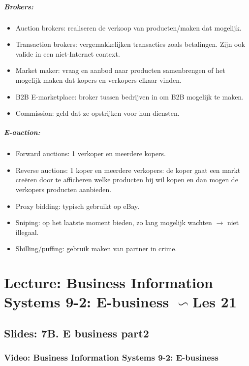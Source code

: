 \documentclass[10pt,a4paper]{report}
\begin{document}
\paragraph{Brokers:}
\begin{itemize}
\item Auction brokers: realiseren de verkoop van producten/maken dat mogelijk.
\item Transaction brokers: vergemakkelijken transacties zoals betalingen. Zijn ook valide in een niet-Internet context.
\item Market maker: vraag en aanbod naar producten samenbrengen of het mogelijk maken dat kopers en verkopers elkaar vinden.
\item B2B E-marketplace: broker tussen bedrijven in om B2B mogelijk te maken.
\item Commission: geld dat ze opstrijken voor hun diensten.
\end{itemize}

\paragraph{E-auction:}
\begin{itemize}
\item Forward auctions: 1 verkoper en meerdere kopers.
\item Reverse auctions: 1 koper en meerdere verkopers: de koper gaat een markt creëren door te afficheren welke producten hij wil kopen en dan mogen de verkopers producten aanbieden.
\item Proxy bidding: typisch gebruikt op eBay.
\item Sniping: op het laatste moment bieden, zo lang mogelijk wachten $\rightarrow$ niet illegaal.
\item Shilling/puffing: gebruik maken van partner in crime.
\end{itemize}

\chapter{Lecture: Business Information Systems 9-2: E-business $\backsim$Les 21}
\section{Slides: 7B. E business part2}
\subsection{Video: Business Information Systems 9-2: E-business}
\end{document}
